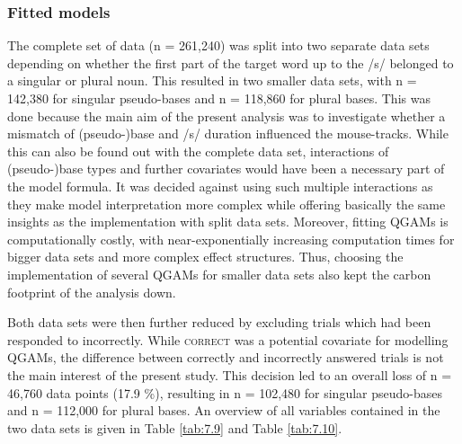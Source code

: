 \subsubsection{Fitted models}\label{section07_2_3_1}

The complete set of data (n = 261,240) was split into two separate data sets depending on whether the first part of the target word up to the /s/ belonged to a singular or plural noun. This resulted in two smaller data sets, with n = 142,380 for singular pseudo-bases and n = 118,860 for plural bases. This was done because the main aim of the present analysis was to investigate whether a mismatch of (pseudo-)base and /s/ duration influenced the mouse-tracks. While this can also be found out with the complete data set, interactions of (pseudo-)base types and further covariates would have been a necessary part of the model formula. It was decided against using such multiple interactions as they make model interpretation more complex while offering basically the same insights as the implementation with split data sets. Moreover, fitting QGAMs is computationally costly, with near-exponentially increasing computation times for bigger data sets and more complex effect structures. Thus, choosing the implementation of several QGAMs for smaller data sets also kept the carbon footprint of the analysis down.

Both data sets were then further reduced by excluding trials which had been responded to incorrectly. While \textsc{correct} was a potential covariate for modelling QGAMs, the difference between correctly and incorrectly answered trials is not the main interest of the present study. This decision led to an overall loss of n = 46,760 data points (17.9 \%), resulting in n = 102,480 for singular pseudo-bases and n = 112,000 for plural bases. An overview of all variables contained in the two data sets is given in Table \ref{tab:7.9} and Table \ref{tab:7.10}.


